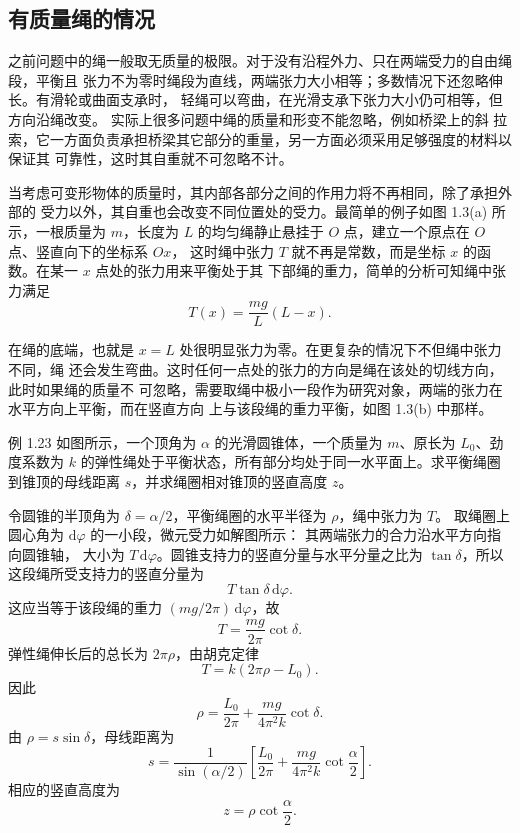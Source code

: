 \subsection{有质量绳的情况}

之前问题中的绳一般取无质量的极限。对于没有沿程外力、只在两端受力的自由绳段，平衡且
张力不为零时绳段为直线，两端张力大小相等；多数情况下还忽略伸长。有滑轮或曲面支承时，
轻绳可以弯曲，在光滑支承下张力大小仍可相等，但方向沿绳改变。
实际上很多问题中绳的质量和形变不能忽略，例如桥梁上的斜
拉索，它一方面负责承担桥梁其它部分的重量，另一方面必须采用足够强度的材料以保证其
可靠性，这时其自重就不可忽略不计。

当考虑可变形物体的质量时，其内部各部分之间的作用力将不再相同，除了承担外部的
受力以外，其自重也会改变不同位置处的受力。最简单的例子如图 1.3(a) 所示，一根质量为
$m$，长度为 $L$ 的均匀绳静止悬挂于 $O$ 点，建立一个原点在 $O$ 点、竖直向下的坐标系 $Ox$，
这时绳中张力 $T$ 就不再是常数，而是坐标 $x$ 的函数。在某一 $x$ 点处的张力用来平衡处于其
下部绳的重力，简单的分析可知绳中张力满足
\[
  T(x)=\frac{mg}{L}(L-x).
\]

在绳的底端，也就是 $x=L$ 处很明显张力为零。在更复杂的情况下不但绳中张力不同，绳
还会发生弯曲。这时任何一点处的张力的方向是绳在该处的切线方向，此时如果绳的质量不
可忽略，需要取绳中极小一段作为研究对象，两端的张力在水平方向上平衡，而在竖直方向
上与该段绳的重力平衡，如图 1.3(b) 中那样。


\begin{origexamplebox}{例 1.23}
如图所示，一个顶角为 $\alpha$ 的光滑圆锥体，一个质量为 $m$、原长为 $L_0$、劲度系数为
$k$ 的弹性绳处于平衡状态，所有部分均处于同一水平面上。求平衡绳圈到锥顶的母线距离
$s$，并求绳圈相对锥顶的竖直高度 $z$。
\end{origexamplebox}

\begin{xesolution}
令圆锥的半顶角为 $\delta=\alpha/2$，平衡绳圈的水平半径为 $\rho$，绳中张力为 $T$。
取绳圈上圆心角为 $\mathrm d\varphi$ 的一小段，微元受力如解图所示：
\soldiagOneTwentyThree
其两端张力的合力沿水平方向指向圆锥轴，
大小为 $T\,\mathrm d\varphi$。圆锥支持力的竖直分量与水平分量之比为 $\tan\delta$，所以
这段绳所受支持力的竖直分量为
\[
  T\tan\delta\,\mathrm d\varphi.
\]
这应当等于该段绳的重力 $(mg/2\pi)\,\mathrm d\varphi$，故
\[
  T=\frac{mg}{2\pi}\cot\delta.
\]
弹性绳伸长后的总长为 $2\pi\rho$，由胡克定律
\[
  T=k(2\pi\rho-L_0).
\]
因此
\[
  \rho=\frac{L_0}{2\pi}+\frac{mg}{4\pi^2k}\cot\delta.
\]
由 $\rho=s\sin\delta$，母线距离为
\[
  \boxed{s=\frac{1}{\sin(\alpha/2)}
  \left[\frac{L_0}{2\pi}+\frac{mg}{4\pi^2k}\cot\frac\alpha2\right]}.
\]
相应的竖直高度为
\[
  \boxed{z=\rho\cot\frac\alpha2}.
\]
\end{xesolution}

